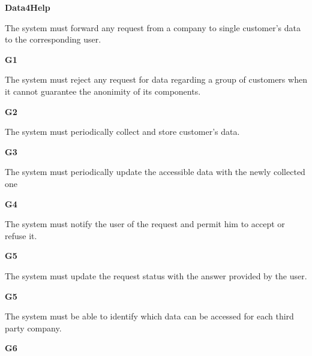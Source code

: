 \documentclass[../main.tex]{subfiles}
\begin{document}
\begin{minipage}{\textwidth}
\vspace{4mm}
{\bf Data4Help}

\vspace{0.5cm}

\begin{description}
	\item [R1] The system must forward any request from a company to single customer's data to the corresponding user.
	\item \begin{flushright}{\bf{G1}}\end{flushright}

	\item [R2] The system must reject any request for data regarding a group of customers when it cannot guarantee the anonimity of its components.
	\item \begin{flushright}{\bf{G2}}\end{flushright}

	\item [R3] The system must periodically collect and store customer's data.
	\item \begin{flushright}{\bf{G3}}\end{flushright}

	\item [R4] The system must periodically update the accessible data with the newly collected one
	\item \begin{flushright}{\bf{G4}}\end{flushright}

	\item [R5] The system must notify the user of the request and permit him to accept or refuse it.
	\item \begin{flushright}{\bf{G5}}\end{flushright}

	\item [R6] The system must update the request status with the answer provided by the user.
	\item \begin{flushright}{\bf{G5}}\end{flushright}

	\item [R7] The system must be able to identify which data can be accessed for each third party company.
	\item \begin{flushright}{\bf{G6}}\end{flushright}

\end{description}
\end{minipage}
\vspace{8mm}
\end{document}

